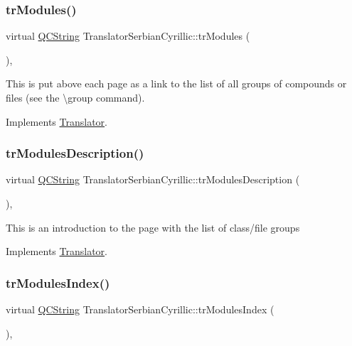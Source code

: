 \subsubsection{\texorpdfstring{trModules()}{trModules()}}
{\footnotesize\ttfamily virtual \mbox{\hyperlink{class_q_c_string}{Q\+C\+String}} Translator\+Serbian\+Cyrillic\+::tr\+Modules (\begin{DoxyParamCaption}{ }\end{DoxyParamCaption})\hspace{0.3cm}{\ttfamily [inline]}, {\ttfamily [virtual]}}

This is put above each page as a link to the list of all groups of compounds or files (see the \textbackslash{}group command). 

Implements \mbox{\hyperlink{class_translator}{Translator}}.

\mbox{\label{class_translator_serbian_cyrillic_af2862f58c96b5e6d349af7bf1d316c27}} 
\subsubsection{\texorpdfstring{trModulesDescription()}{trModulesDescription()}}
{\footnotesize\ttfamily virtual \mbox{\hyperlink{class_q_c_string}{Q\+C\+String}} Translator\+Serbian\+Cyrillic\+::tr\+Modules\+Description (\begin{DoxyParamCaption}{ }\end{DoxyParamCaption})\hspace{0.3cm}{\ttfamily [inline]}, {\ttfamily [virtual]}}

This is an introduction to the page with the list of class/file groups 

Implements \mbox{\hyperlink{class_translator}{Translator}}.

\mbox{\label{class_translator_serbian_cyrillic_aff7ed71b249065cac36f566467eb1cbb}} 
\subsubsection{\texorpdfstring{trModulesIndex()}{trModulesIndex()}}
{\footnotesize\ttfamily virtual \mbox{\hyperlink{class_q_c_string}{Q\+C\+String}} Translator\+Serbian\+Cyrillic\+::tr\+Modules\+Index (\begin{DoxyParamCaption}{ }\end{DoxyParamCaption})\hspace{0.3cm}{\ttfamily [inline]}, {\ttfamily [virtual]}}

